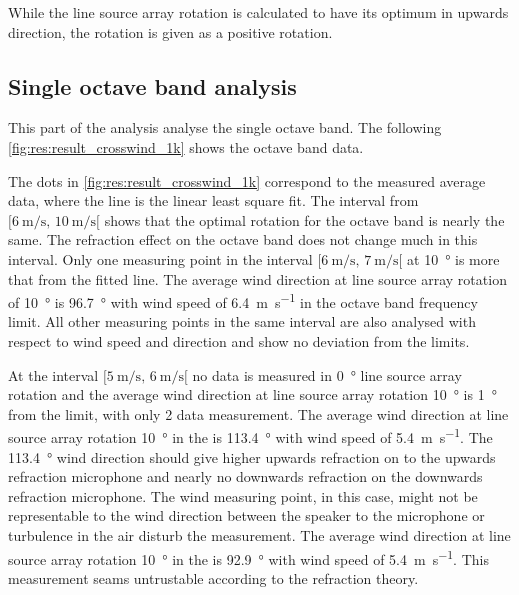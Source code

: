 While the line source array rotation is calculated to have its optimum in upwards direction, the rotation is given as a positive rotation. 


\subsection{Single octave band analysis}\label{res:ana:single}
This part of the analysis analyse the single octave band. The following \autoref{fig:res:result_crosswind_1k}  shows the  octave band data.  

 

 
 The dots in \autoref{fig:res:result_crosswind_1k} correspond to the measured average data, where the line is the linear least square fit. The interval from $[\SI{6}{\meter\per\second},\, \SI{10}{\meter\per\second}[ $ shows that the optimal rotation for the  octave band is nearly the same. The refraction effect on the   octave band does not change much in this interval. Only one measuring point in the interval $[\SI{6}{\meter\per\second},\, \SI{7}{\meter\per\second}[ $ at \SI{10}{\degree} is more that  from the fitted line. The average wind direction at line source array rotation of \SI{10}{\degree} is \SI{96.7}{\degree} with wind speed of \SI{6.4}{\meter\per\second} in the  octave band frequency limit. All other measuring points in the same interval are also analysed with respect to wind speed and direction and show no deviation from the limits. 

At the interval $[\SI{5}{\meter\per\second},\, \SI{6}{\meter\per\second}[ $ no data is measured in \SI{0}{\degree} line source array rotation and the average wind direction at line source array rotation \SI{10}{\degree} is \SI{1}{\degree} from the limit, with only 2 data measurement. The average wind direction at line source array rotation \SI{10}{\degree} in the  is \SI{113.4}{\degree} with wind speed of \SI{5.4}{\meter\per\second}. The \SI{113.4}{\degree} wind direction should give higher upwards refraction on to the upwards refraction microphone and nearly no downwards refraction on the downwards refraction microphone. The wind measuring point, in this case, might not be representable to the wind direction between the speaker to the microphone or turbulence in the air disturb the measurement. The average wind direction at line source array rotation \SI{10}{\degree} in the  is \SI{92.9}{\degree} with wind speed of \SI{5.4}{\meter\per\second}.  This measurement seams untrustable according to the refraction theory.
 
